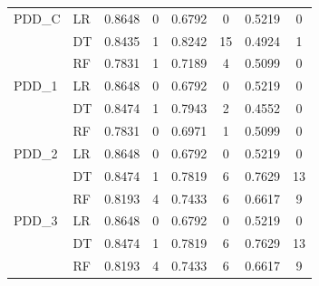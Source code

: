 \begin{table}[h]
\begin{tabular}{llcccccc}
    \midrule
    PDD\_C   & LR & 0.8648 & 0 & 0.6792 & 0 & 0.5219 & 0 \\
             & DT & 0.8435 & 1 & 0.8242 & 15 & 0.4924 & 1 \\
             & RF & 0.7831 & 1 & 0.7189 & 4 & 0.5099 & 0 \\
    \midrule
    PDD\_1   & LR & 0.8648 & 0 & 0.6792 & 0 & 0.5219 & 0 \\
             & DT & 0.8474 & 1 & 0.7943 & 2 & 0.4552 & 0 \\
             & RF & 0.7831 & 0 & 0.6971 & 1 & 0.5099 & 0 \\
    \midrule
    PDD\_2   & LR & 0.8648 & 0 & 0.6792 & 0 & 0.5219 & 0 \\
             & DT & 0.8474 & 1 & 0.7819 & 6 & 0.7629 & 13 \\
             & RF & 0.8193 & 4 & 0.7433 & 6 & 0.6617 & 9 \\
    \midrule
    PDD\_3   & LR & 0.8648 & 0 & 0.6792 & 0 & 0.5219 & 0 \\
             & DT & 0.8474 & 1 & 0.7819 & 6 & 0.7629 & 13 \\
             & RF & 0.8193 & 4 & 0.7433 & 6 & 0.6617 & 9 \\
    \bottomrule
    \end{tabular}
\end{table}

